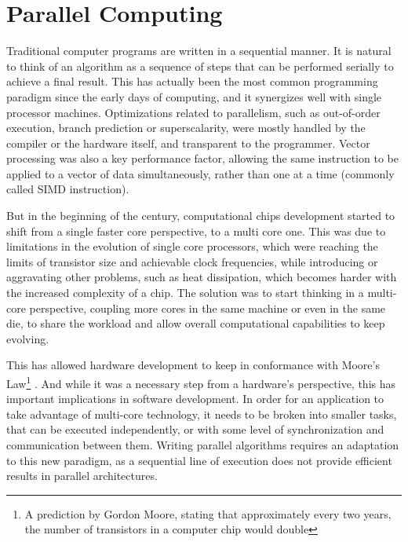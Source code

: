 \documentclass[main.tex]{subfiles}
\begin{document}
\section{Parallel Computing}

Traditional computer programs are written in a sequential manner. It is natural to think of an algorithm as a sequence of steps that can be performed serially to achieve a final result. This has actually been the most common programming paradigm since the early days of computing, and it synergizes well with single processor machines. Optimizations related to parallelism, such as out-of-order execution, branch prediction or superscalarity, were mostly handled by the compiler or the hardware itself, and transparent to the programmer. Vector processing was also a key performance factor, allowing the same instruction to be applied to a vector of data simultaneously, rather than one at a time (commonly called \ac{SIMD} instruction).

But in the beginning of the  century, computational chips development started to shift from a single faster core perspective, to a multi core one. This was due to limitations in the evolution of single core processors, which were reaching the limits of transistor size and achievable clock frequencies, while introducing or aggravating other problems, such as heat dissipation, which becomes harder with the increased complexity of a chip. The solution was to start thinking in a multi-core perspective, coupling more cores in the same machine or even in the same die, to share the workload and allow overall computational capabilities to keep evolving.

This has allowed hardware development to keep in conformance with Moore's Law\footnote{A prediction by Gordon Moore, stating that approximately every two years, the number of transistors in a computer chip would double} . And while it was a necessary step from a hardware's perspective, this has important implications in software development. In order for an application to take advantage of multi-core technology, it needs to be broken into smaller tasks, that can be executed independently, or with some level of synchronization and communication between them. Writing parallel algorithms requires an adaptation to this new paradigm, as a sequential line of execution does not provide efficient results in parallel architectures.
\end{document}
